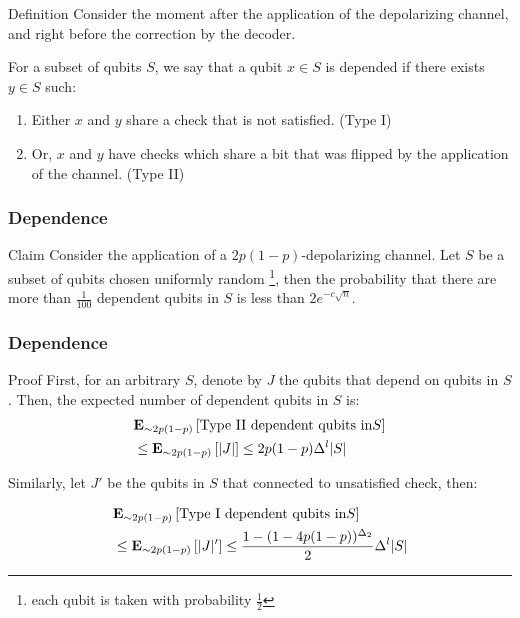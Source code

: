 \documentclass{beamer}
\begin{document}
\begin{frame}
  \begin{block}{Definition}
Consider the moment after the application of the depolarizing channel, and right before the correction by the decoder.

For a subset of qubits $S$, we say that a qubit $x \in S$ is depended if there exists $y \in S$ such:
\begin{enumerate}
  \item Either $x$ and $y$ share a check that is not satisfied. (Type I)  
  \item Or, $x$ and $y$ have checks which share a bit that was flipped by the application of the channel. (Type II)
\end{enumerate}
  \end{block}
\end{frame}


\begin{frame}
  \frametitle{Dependence}

  \begin{block}{Claim}
    Consider the application of a $2p(1-p)$-depolarizing channel. Let $S$ be a subset of qubits chosen uniformly random \footnote{each qubit is taken with probability $\frac{1}{2}$}, then the probability that there are more than $\frac{1}{100}$ dependent qubits in $S$ is less than $2e^{-c\sqrt{n}}$.
  \end{block}

    
  \end{frame}

  \begin{frame}
  \frametitle{Dependence}

  \begin{block}{Proof}
    First, for an arbitrary $S$, denote by $J$ the qubits that depend on qubits in $S$. Then, the expected number of dependent qubits in $S$ is:
    \begin{align*}
      & \exppm{  \text{Type II dependent qubits in} S  }{ \sim 2p(1-p) } \\ 
      & \le \exppm{  |J|  }{ \sim 2p(1-p) } \le 2p(1-p) \Delta^{l} |S| 
    \end{align*}
    
    Similarly, let $J\prime$ be the qubits in $S$ that connected to unsatisfied check, then:

    \begin{align*}
      & \exppm{  \text{Type I dependent qubits in} S  }{ \sim 2p(1-p) } \\ 
      & \le \exppm{  |J|^{\prime}  }{ \sim 2p(1-p) } \le \frac{1 - ( 1-4p(1-p))^{\Delta_{2}} }{2} \Delta^{l} |S| 
    \end{align*}
  \end{block}
\end{frame}
\end{document}
